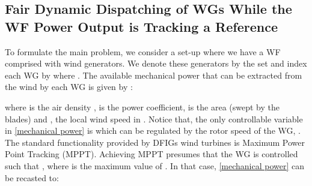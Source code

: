 \documentclass[letterpaper, 10 pt, conference]{ieeeconf}
\begin{document}
\subsection{Fair Dynamic Dispatching of WGs  While the WF Power Output is Tracking a Reference}
To formulate the main problem, we consider a set-up where we have a WF comprised with  wind generators. We denote these generators by the set  and index each WG by  where . The available mechanical power that can be extracted from the wind by each WG is given by \cite{Pai}:

where  is the air density ,  is the power coefficient,   is the area (swept by the blades) and , the local wind speed in . Notice that, the only controllable variable in \eqref{mechanical power} is   which can be regulated by the rotor speed of the WG,  . The standard functionality provided by DFIGs wind turbines is Maximum Power Point Tracking (MPPT). Achieving MPPT presumes that the WG is controlled such that  , where  is the maximum value of . In that case, \eqref{mechanical power} can be recasted to:
\end{document}
